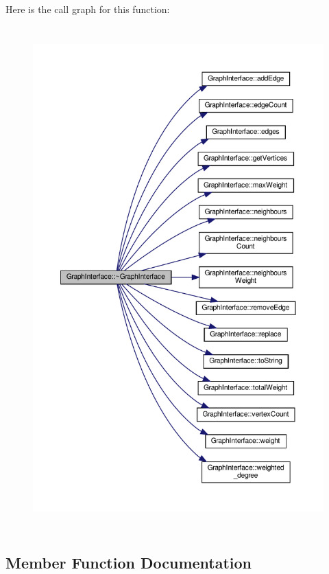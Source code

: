 Here is the call graph for this function\+:
\nopagebreak
\begin{figure}[H]
\begin{center}
\leavevmode
\includegraphics[height=550pt]{classGraphInterface_a5f708904a9469c548d85a6788a245340_cgraph}
\end{center}
\end{figure}


\subsection{Member Function Documentation}
\mbox{\label{classGraphInterface_ad72b49c0585d378b7a6488cf07074586}} 
